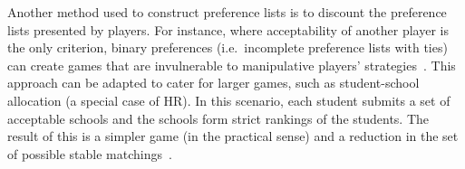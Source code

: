 Another method used to construct preference lists is to discount the preference
lists presented by players. For instance, where acceptability of another player
is the only criterion, binary preferences (i.e.\ incomplete preference lists
with ties) can create games that are invulnerable to manipulative players'
strategies~\cite{Bogomolnaia2004}. This approach can be adapted to cater for
larger games, such as student-school allocation (a special case of HR). In this
scenario, each student submits a set of acceptable schools and the schools form
strict rankings of the students. The result of this is a simpler game (in the
practical sense) and a reduction in the set of possible stable
matchings~\cite{Haeringer2014,Haeringer2019}.
